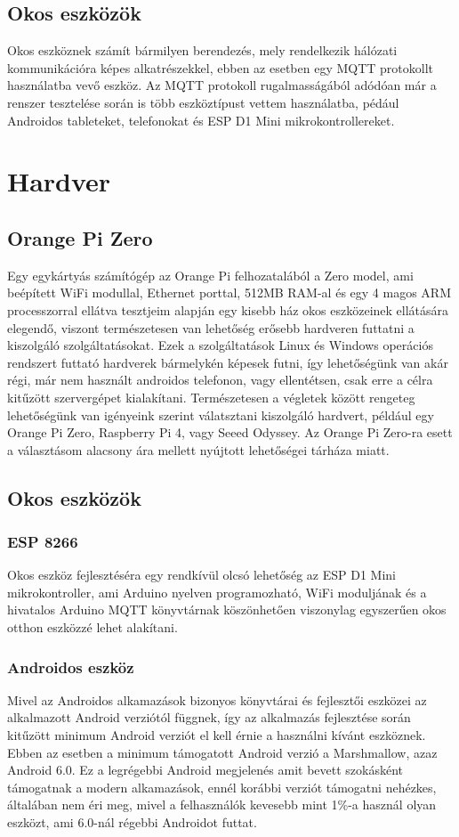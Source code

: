 \documentclass[
]{thesis-ekf}
\theoremstyle{definition}
\theoremstyle{remark}
\begin{document}
\section{Okos eszközök}
Okos eszköznek számít bármilyen berendezés, mely rendelkezik hálózati kommunikációra képes alkatrészekkel, 
ebben az esetben egy MQTT protokollt használatba vevő eszköz. Az MQTT protokoll rugalmasságából adódóan már a renszer tesztelése során is több eszköztípust 
vettem használatba, pédául Androidos tableteket, telefonokat és ESP D1 Mini mikrokontrollereket.



\chapter{Hardver}
\section{Orange Pi Zero}
Egy egykártyás számítógép az Orange Pi felhozatalából a Zero model, ami beépített WiFi modullal, Ethernet porttal, 
512MB RAM-al és egy 4 magos ARM processzorral ellátva tesztjeim alapján egy kisebb ház okos eszközeinek ellátására elegendő, 
viszont természetesen van lehetőség erősebb hardveren futtatni a kiszolgáló szolgáltatásokat. Ezek a szolgáltatások 
Linux és Windows operációs rendszert futtató hardverek bármelykén képesek futni, így lehetőségünk van akár 
régi, már nem használt androidos telefonon, vagy ellentétsen, csak erre a célra kitűzött szervergépet kialakítani. Természetesen 
a végletek között rengeteg lehetőségünk van igényeink szerint válatsztani kiszolgáló hardvert, például egy Orange Pi Zero, Raspberry Pi 4, vagy Seeed Odyssey.
Az Orange Pi Zero-ra esett a választásom alacsony ára mellett nyújtott lehetőségei tárháza miatt.
\section{Okos eszközök}
\subsection{ESP 8266}
Okos eszköz fejlesztéséra egy rendkívül olcsó lehetőség az ESP D1 Mini mikrokontroller, ami Arduino nyelven
programozható, WiFi moduljának és a hivatalos Arduino MQTT könyvtárnak köszönhetően viszonylag egyszerűen okos otthon eszközzé lehet alakítani.
\subsection{Androidos eszköz}
Mivel az Androidos alkamazások bizonyos könyvtárai és fejlesztői eszközei az alkalmazott Android verziótól függnek, így az alkalmazás fejlesztése során
kitűzött minimum Android verziót el kell érnie a használni kívánt eszköznek. Ebben az esetben a minimum támogatott Android verzió a Marshmallow, azaz Android 6.0.
Ez a legrégebbi Android megjelenés amit bevett szokásként támogatnak a modern alkamazások, ennél korábbi verziót támogatni nehézkes, általában nem éri meg, mivel
a felhasználók kevesebb mint 1\%-a használ olyan eszközt, ami 6.0-nál régebbi Androidot futtat.
\end{document}
